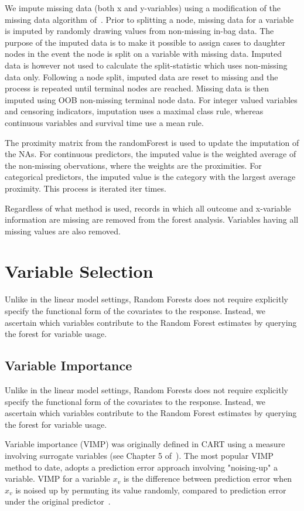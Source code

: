 \documentclass[nojss]{jss}\usepackage[]{graphicx}\usepackage[]{color}
\begin{document}
We impute missing data (both x and y-variables) using a modification of the missing data algorithm of~\cite{Ishwaran:2008}. Prior to splitting a node, missing data for a variable is imputed by randomly drawing values from non-missing in-bag data. The purpose of the imputed data is to make it possible to assign cases to daughter nodes in the event the node is split on a variable with missing data. Imputed data is however not used to calculate the split-statistic which uses non-missing data only. Following a node split, imputed data are reset to missing and the process is repeated until terminal nodes are reached. Missing data is then imputed using OOB non-missing terminal node data. For integer valued variables and censoring indicators, imputation uses a maximal class rule, whereas continuous variables and survival time use a mean rule.

The proximity matrix from the randomForest is used to update the imputation of the NAs. For continuous predictors, the imputed value is the weighted average of the non-missing obervations, where the weights are the proximities. For categorical predictors, the imputed value is the category with the largest average proximity. This process is iterated iter times.

Regardless of what method is used, records in which all outcome and x-variable information are missing are removed from the forest analysis. Variables having all missing values are also removed.


\section{Variable Selection}
Unlike in the linear model settings, Random Forests does not require explicitly specify the functional form of the covariates to the response. Instead, we ascertain which variables contribute to the Random Forest estimates by querying the forest for variable usage. 

\subsection{Variable Importance}\label{S:vimp}
Unlike in the linear model settings, Random Forests does not require explicitly specify the functional form of the covariates to the response. Instead, we ascertain which variables contribute to the Random Forest estimates by querying the forest for variable usage. 

Variable importance (VIMP) was originally defined in CART using a measure involving surrogate variables (see Chapter 5 of~\cite{cart:1984}). The most popular VIMP method to date, adopts a prediction error approach involving "noising-up" a variable. VIMP for a variable $x_v$ is the difference between prediction error when $x_v$ is noised up by permuting its value randomly, compared to prediction error under the original predictor~\citep{Breiman:2001, liaw:2002, Ishwaran:2007, Ishwaran:2008}.
\end{document}
